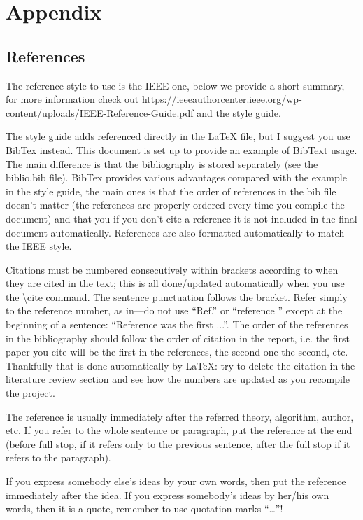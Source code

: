 
\section*{Appendix}

\subsection{References}

The reference style to use is the IEEE one, below we provide a short summary, for more information check out \url{https://ieeeauthorcenter.ieee.org/wp-content/uploads/IEEE-Reference-Guide.pdf} and the style guide.

The style guide adds referenced directly in the LaTeX file, but I suggest you use BibTex instead. This document is set up to provide an example of BibText usage. The main difference is that the bibliography is stored separately (see the biblio.bib file). BibTex provides various advantages compared with the example in the style guide, the main ones is that the order of references in the bib file doesn't matter (the references are properly ordered every time you compile the document) and that you if you don't cite a reference it is not included in the final document automatically. References are also formatted automatically to match the IEEE style.

Citations must be numbered consecutively within brackets according to when they are cited in the text; this is all done/updated automatically when you use the \textbackslash cite command. The sentence punctuation follows the bracket. Refer simply to the reference number, as in—do not use “Ref.” or “reference ” except at the beginning of a sentence: “Reference was the first ...”. The order of the references in the bibliography should follow the order of citation in the report, i.e. the first paper you cite will be the first in the references, the second one the second, etc. Thankfully that is done automatically by LaTeX: try to delete the citation in the literature review section and see how the numbers are updated as you recompile the project.

The reference is usually immediately after the referred theory, algorithm, author, etc. If you refer to the whole sentence or paragraph, put the reference at the end (before full stop, if it refers only to the previous sentence, after the full stop if it refers to the paragraph).

If you express somebody else’s ideas by your own words, then put the reference immediately after the idea. If you express somebody’s ideas by her/his own words, then it is a quote, remember to use quotation marks “…”!

